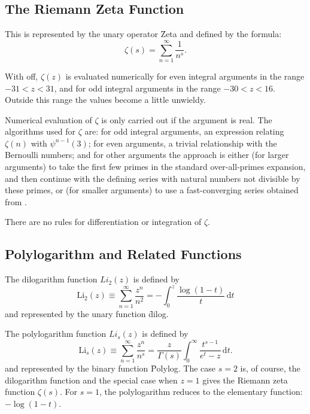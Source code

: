 \subsection{The Riemann Zeta Function}
\hypertarget{operator:ZETA}{}
\hypertarget{RIEMZETA}{}
This is represented by the unary operator \f{Zeta} and defined by the
formula:
\[\zeta(s) = \sum_{n=1}^\infty \frac{1}{n^s}.\]

With  off, $\zeta(z)$ is evaluated numerically for even
integral arguments in the range $-31 < z < 31$, and for odd integral
arguments in the range $-30 < z < 16$.  Outside this range the values
become a little unwieldy.

Numerical evaluation of $\zeta$ is only carried out if the argument is real.
The algorithms used for $\zeta$ are: for odd integral arguments, an
expression relating $\zeta(n)$ with $\psi^{n-1}(3)$; for even arguments, a
trivial relationship with the Bernoulli numbers; and for other arguments the
approach is either (for larger arguments) to take the first few primes in
the standard over-all-primes expansion, and then continue with the defining
series with natural numbers not divisible by these primes, or (for smaller
arguments) to use a fast-converging series obtained from \cite{BenderOrszag:78}.

There are no rules for differentiation or integration of $\zeta$.

\subsection{Polylogarithm and Related Functions}
\hypertarget{operator:LERCH_PHI}{}
\hypertarget{POLYLOG}{}
 
The dilogarithm function $Li_2(z)$ is defined by
\[\mathrm{Li}_2(z) \equiv \sum_{n=1}^\infty \frac{z^n}{n^2} =
-\int_0^z \frac{\log(1-t)}{t}\, \mathrm{d}t\]
and represented by the unary function \f{dilog}.

The polylogarithm function $Li_s(z)$ is defined by
\[\mathrm{Li}_s(z) \equiv \sum_{n=1}^\infty \frac{z^n}{n^s} =
\frac{z}{\Gamma(s)} \int_0^\infty \frac{t^{s-1}}{e^t-z}\, \mathrm{d}t.\]
and represented by the binary function \f{Polylog}.
The case $s=2$ is, of course, the dilogarithm function and the special case
when $z=1$ gives the Riemann zeta function $\zeta(s)$. For $s=1$, the
polylogarithm reduces to the elementary function: $-\log(1-t)$.

